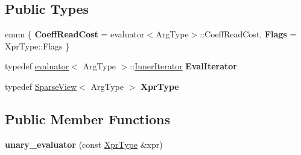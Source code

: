 \subsection*{Public Types}
\begin{DoxyCompactItemize}
\item 
\mbox{\label{struct_eigen_1_1internal_1_1unary__evaluator_3_01_sparse_view_3_01_arg_type_01_4_00_01_iterator_based_01_4_ab1594dd1553de1bc113095b9a6e9f5fa}} 
enum \{ {\bfseries Coeff\+Read\+Cost} = evaluator$<$Arg\+Type$>$\+::Coeff\+Read\+Cost, 
{\bfseries Flags} = Xpr\+Type\+::Flags
 \}
\item 
\mbox{\label{struct_eigen_1_1internal_1_1unary__evaluator_3_01_sparse_view_3_01_arg_type_01_4_00_01_iterator_based_01_4_aba31e381da08b282216b196624adc1a4}} 
typedef \mbox{\hyperlink{struct_eigen_1_1internal_1_1evaluator}{evaluator}}$<$ Arg\+Type $>$\+::\mbox{\hyperlink{class_eigen_1_1_inner_iterator}{Inner\+Iterator}} {\bfseries Eval\+Iterator}
\item 
\mbox{\label{struct_eigen_1_1internal_1_1unary__evaluator_3_01_sparse_view_3_01_arg_type_01_4_00_01_iterator_based_01_4_aac0d074d692ff1674a186e7921046773}} 
typedef \mbox{\hyperlink{class_eigen_1_1_sparse_view}{Sparse\+View}}$<$ Arg\+Type $>$ {\bfseries Xpr\+Type}
\end{DoxyCompactItemize}
\subsection*{Public Member Functions}
\begin{DoxyCompactItemize}
\item 
\mbox{\label{struct_eigen_1_1internal_1_1unary__evaluator_3_01_sparse_view_3_01_arg_type_01_4_00_01_iterator_based_01_4_ae5a5486d8c59702710c174c57e8b392a}} 
{\bfseries unary\+\_\+evaluator} (const \mbox{\hyperlink{class_eigen_1_1_sparse_view}{Xpr\+Type}} \&xpr)
\end{DoxyCompactItemize}
